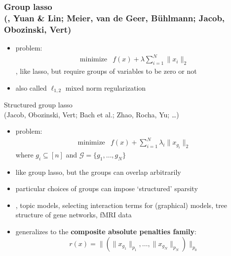 \documentclass[10pt,tgadventor, onlymath]{beamer}
\begin{document}
\begin{frame}
\frametitle{Group lasso \\[-0.3em] 
{\footnotesize \textmd{(\eg, Yuan \& Lin; Meier, van de Geer, B\"uhlmann; Jacob, Obozinski, Vert)}}}
\begin{itemize}\itemsep=12pt
\item problem:
\[
\begin{array}{ll}
\mbox{minimize} & f(x) + \lambda \sum_{i=1}^N \|x_i\|_2
\end{array}
\]
\ie, like lasso, but require groups of variables to be zero or not
\item also called $\ell_{1,2}$ mixed norm regularization
\end{itemize}
\end{frame}

\begin{frame}{Structured group lasso \\[-0.3em] 
{\footnotesize \textmd{(Jacob, Obozinski, Vert; Bach et al.; Zhao, Rocha, Yu; \dots)}}}
\begin{itemize}\itemsep=12pt
\item problem:
\[
\begin{array}{ll}
\mbox{minimize} & f(x) + \sum_{i=1}^N \lambda_i \|x_{g_i}\|_2
\end{array}
\]
where $g_i \subseteq [n]$ and $\mathcal G = \{g_1, \dots, g_N\}$
\item like group lasso, but the groups can overlap arbitrarily
\item particular choices of groups can impose `structured' sparsity
\item \eg, topic models, selecting interaction terms for (graphical) models,
    tree structure of gene networks, fMRI data
\item generalizes to the \textbf{composite absolute penalties family}:
\[
r(x) = \|(\|x_{g_1}\|_{p_1}, \dots, \|x_{g_N}\|_{p_N})\|_{p_0}
\]
\end{itemize}
\end{frame}
\end{document}
